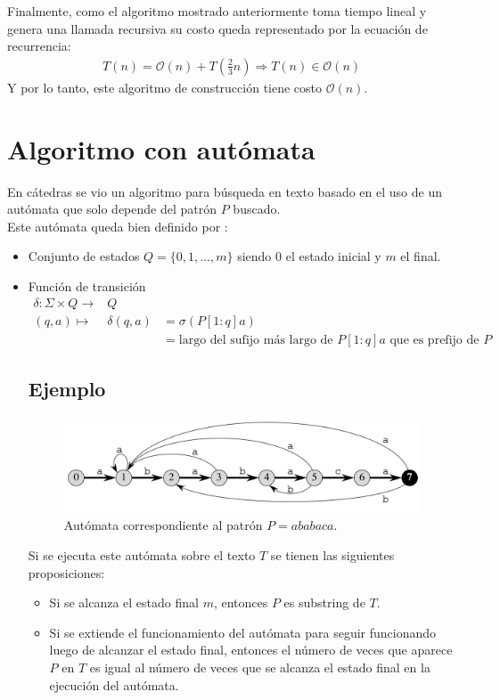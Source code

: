 \documentclass[dcc,uchile]{fcfmcourse}
\begin{document}
Finalmente, como el algoritmo mostrado anteriormente toma tiempo lineal y genera una llamada recursiva su costo queda representado por la ecuación de recurrencia:
\begin{align*}
T(n) = \mathcal{O}(n) + T\left(\frac{2}{3}n\right) \Rightarrow T(n) \in \mathcal{O}(n)
\end{align*}
Y por lo tanto, este algoritmo de construcción tiene costo $\mathcal{O}(n)$.
\section{Algoritmo con autómata}
En cátedras se vio un algoritmo para búsqueda en texto basado en el uso de un autómata que solo depende del patrón $P$ buscado.\\

Este autómata queda bien definido por :
\begin{itemize}
\item Conjunto de estados $Q=\{0, 1, \ldots, m\}$ siendo $0$ el estado inicial y $m$ el final.
\item Función de transición 
\begin{eqnarray*}
\delta: \Sigma \times Q \to & Q & \\
(q, a) \mapsto &\delta(q, a) &= \sigma(P[1:q]a) \\
&  &= \text{largo del sufijo más largo de $P[1:q]a$ que es prefijo de $P$}
\end{eqnarray*}
\subsection*{Ejemplo}
\begin{figure}[h]\footnotesize
  \begin{center}
      \includegraphics[scale=0.28]{imagenes/automata.png}
  \caption{Autómata correspondiente al patrón $P=ababaca$.}
  \end{center}
\end{figure}
Si se ejecuta este autómata sobre el texto $T$ se tienen las siguientes proposiciones:
\begin{itemize}
\item Si se alcanza el estado final $m$, entonces $P$ es substring de $T$.
\item Si se extiende el funcionamiento del autómata para seguir funcionando luego de alcanzar el estado final, entonces el número de veces que aparece $P$ en $T$ es igual al número de veces que se alcanza el estado final en la ejecución del autómata.
\end{itemize}
\end{itemize}
\end{document}
